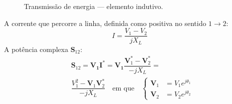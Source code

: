 \vspace{-0.5em}
\begin{centering}
    \begin{minipage}[b]{0.5\linewidth}
        \begin{figure}[H]
        \centering
        \caption{Transmissão de energia --- elemento indutivo.}
        \end{figure}
\end{minipage}%
    \begin{minipage}[b]{0.5\linewidth}
        \begin{mdframed}
            A corrente que percorre a linha, definida como positiva no sentido $1 \rightarrow 2$:
            $$
                I = \dfrac{V_1 - V_2}{j X_L}
            $$
            A potência complexa $\mathbf{S}_{12}$:
            $$
            \begin{aligned}
                &\mathbf{S}_{12} = \mathbf{V_1} \mathbf{I^*} = \mathbf{V_1}\dfrac{ \mathbf{V}_1^* -  \mathbf{V}_2^*}{-j X_L} =\\ &\dfrac{ V_1^2 - \mathbf{V}_1\mathbf{V}_2^*}{-j X_L}\quad\text{em que}\quad
                \left\{\begin{aligned}
                    \mathbf{V}_1 &= V_1 e^{j\theta_1} \\
                    \mathbf{V}_2 &= V_2 e^{j\theta_2}
                \end{aligned}\right.
            \end{aligned}
            $$
        \end{mdframed}
    \end{minipage}
\end{centering}


